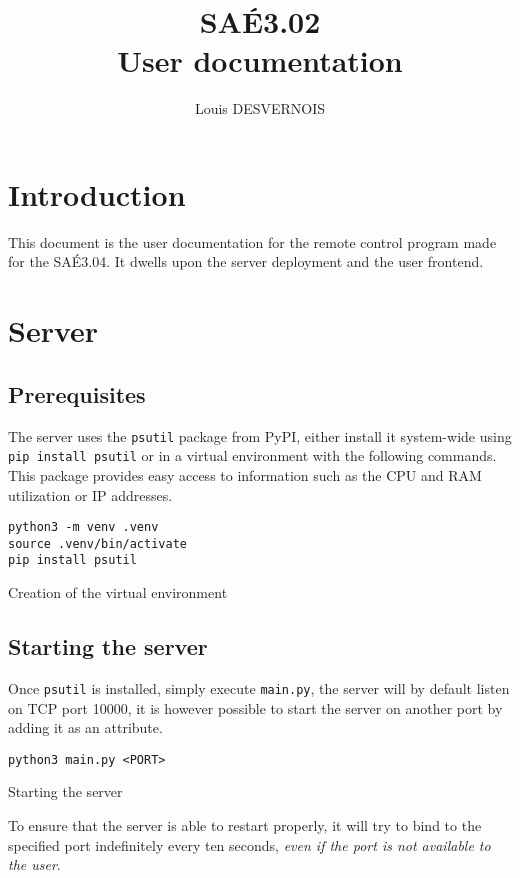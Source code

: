 \documentclass{article}
\author{Louis DESVERNOIS}
\title{%
    SAÉ3.02 \\
    \large User documentation}
\begin{document}
\maketitle
\tableofcontents
\listoffigures
\listoflistings

\newpage
\section{Introduction}
This document is the user documentation for the remote control program made for
the SAÉ3.04. It dwells upon the server deployment and the user frontend.

\section{Server}
\subsection{Prerequisites}
The server uses the \verb|psutil| package from PyPI, either install it
system-wide using \verb|pip install psutil| or in a virtual environment with the
following commands. This package provides easy access to information such as the
CPU and RAM utilization or IP addresses.

\begin{listing}[H]
    \begin{verbatim}
python3 -m venv .venv
source .venv/bin/activate
pip install psutil
    \end{verbatim}
    \caption{Creation of the virtual environment}
    \label{venv:creation}
\end{listing}

\subsection{Starting the server}
Once \verb|psutil| is installed, simply execute \verb|main.py|, the server will
by default listen on TCP port 10000, it is however possible to start the server
on another port by adding it as an attribute.

\begin{listing}[H]
    \begin{verbatim}
python3 main.py <PORT>
    \end{verbatim}
    \caption{Starting the server}
    \label{venv:startingserver}
\end{listing}

To ensure that the server is able to restart properly, it will try to bind to
the specified port indefinitely every ten seconds, \emph{even if the port is not
available to the user}.
\end{document}
